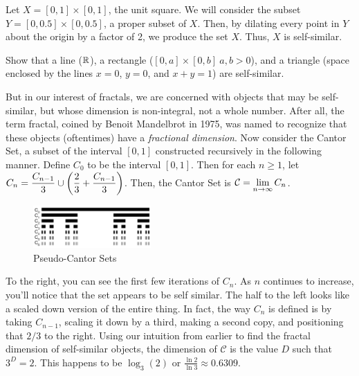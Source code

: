 \begin{example}
    Let $X=[0,1]\times[0,1]$, the unit square. We will consider the subset $Y=[0,0.5]\times[0,0.5]$, a proper subset of $X$. Then, by dilating every point in $Y$ about the origin by a factor of 2, we produce the set $X$. Thus, $X$ is self-similar.
\end{example}

\begin{exercise}
    Show that a line ($\mathbb{R}$), a rectangle ($[0,a]\times[0,b] \ a,b>0$), and a triangle (space enclosed by the lines $x=0$, $y=0$, and $x+y=1$)  are self-similar.
\end{exercise}

But in our interest of fractals, we are concerned with objects that may be self-similar, but whose dimension is non-integral, not a whole number. After all, the term fractal, coined by Benoit Mandelbrot in 1975, was named to recognize that these objects (oftentimes) have a \emph{fractional dimension}. Now consider the Cantor Set, a subset of the interval $[0,1]$ constructed recursively in the following manner. Define $C_0$ to be the interval $[0,1]$. Then for each $n\geq 1$, let $\displaystyle C_n = \frac{C_{n-1}}{3}\cup \left(\frac{2}{3} + \frac{C_{n-1}}{3}\right)$. Then, the Cantor Set is $\displaystyle \mathcal{C}=\lim_{n\to\infty} C_n$. \par

\begin{figure}
  \begin{center}
    \includegraphics[width=0.4\textwidth]{Images/1.4.3.png}
  \end{center}
  \caption{Pseudo-Cantor Sets}
\end{figure}

To the right, you can see the first few iterations of $C_n$. As $n$ continues to increase, you'll notice that the set appears to be self similar. The half to the left looks like a scaled down version of the entire thing. In fact, the way $C_n$ is defined is by taking $C_{n-1}$, scaling it down by a third, making a second copy, and positioning that $2/3$ to the right. Using our intuition from earlier to find the fractal dimension of self-similar objects, the dimension of $\mathcal{C}$ is the value $D$ such that $3^D = 2$. This happens to be $\log_3(2)$ or $ \frac{\ln 2}{\ln 3} \approx 0.6309$. \par

